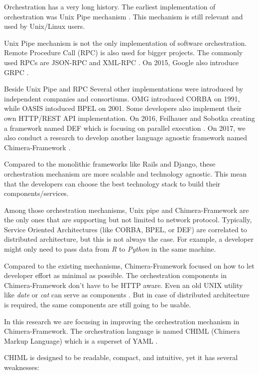 \documentclass[conference]{IEEEtran}
\begin{document}
Orchestration has a very long history. The earliest implementation of orchestration was Unix Pipe mechanism \cite{mcilroy1968mass}. This mechanism is still relevant and used by Unix/Linux users.

Unix Pipe mechanism is not the only implementation of software orchestration. Remote Procedure Call (RPC) is also used for bigger projects. The commonly used RPCs are JSON-RPC \cite{jsonrpc} and XML-RPC \cite{xmlrpc}. On 2015, Google also introduce GRPC \cite{grpc}.

Beside Unix Pipe and RPC Several other implementations were introduced by independent companies and consortiums. OMG introduced CORBA on 1991, while OASIS intoduced BPEL on 2001. Some developers also implement their own HTTP/REST API implementation. On 2016, Feilhauer and Sobotka creating a framework named DEF which is focusing on parallel execution \cite{feilhauer2016def}. On 2017, we also conduct a research to develop another language agnostic framework named Chimera-Framework \cite{gunawan2017chimera}.

Compared to the monolithic frameworks like Rails and Django, these orchestration mechanism are more scalable and technology agnostic. This mean that the developers can choose the best technology stack to build their components/services.

Among those orchestration mechanisms, Unix pipe and Chimera-Framework are the only ones that are supporting but not limited to network protocol. Typically, Service Oriented Architectures (like CORBA, BPEL, or DEF) are correlated to distributed architecture, but this is not always the case. For example, a developer might only need to pass data from {\it R } to {\it Python } in the same machine.

Compared to the existing mechanisms, Chimera-Framework focused on how to let developer effort as minimal as possible. The orchestration components in Chimera-Framework don't have to be HTTP aware. Even an old UNIX utility like {\it date} or {\it cat} can serve as components \cite{gunawan2017chimera}. But in case of distributed architecture is required, the same components are still going to be usable.

In this research we are focusing in improving the orchestration mechanism in Chimera-Framework. The orchestration language is named CHIML (Chimera Markup Language) which is a superset of YAML \cite{yaml}.

CHIML is designed to be readable, compact, and intuitive, yet it has several weaknesses:
\end{document}
